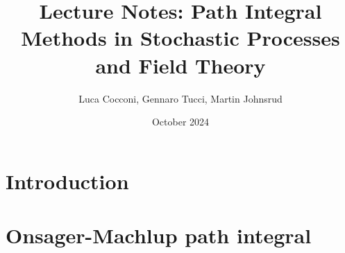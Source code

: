 \documentclass[10pt, a4paper, oneside]{book}
\title{Lecture Notes: Path Integral Methods in Stochastic Processes and Field Theory}
\author{Luca Cocconi, Gennaro Tucci, Martin Johnsrud}
\date{October 2024}
\begin{document}
\maketitle

\let\clearpage\relax

\chapter{Introduction}


\newpage
\chapter{Onsager-Machlup path integral}

\end{document}
